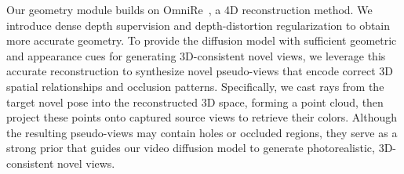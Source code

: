 Our geometry module builds on OmniRe~\cite{chen2024omnire}, a 4D reconstruction method. We introduce dense depth supervision and depth-distortion regularization to obtain more accurate geometry. To provide the diffusion model with sufficient geometric and appearance cues for generating 3D-consistent novel views, we leverage this accurate reconstruction to synthesize novel pseudo-views that encode correct 3D spatial relationships and occlusion patterns. Specifically, we cast rays from the target novel pose into the reconstructed 3D space, forming a point cloud, then project these points onto captured source views to retrieve their colors. Although the resulting pseudo-views may contain holes or occluded regions, they serve as a strong prior that guides our video diffusion model to generate photorealistic, 3D-consistent novel views.






